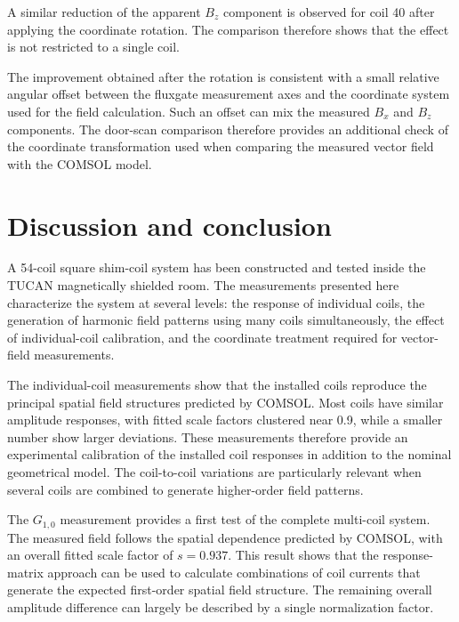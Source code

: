\documentclass[preprint,12pt]{elsarticle}
\begin{document}
A similar reduction of the apparent $B_z$ component is observed for
coil 40 after applying the coordinate rotation. The comparison
therefore shows that the effect is not restricted to a single coil.

The improvement obtained after the rotation is consistent with a small
relative angular offset between the fluxgate measurement axes and the
coordinate system used for the field calculation. Such an offset can
mix the measured $B_x$ and $B_z$ components. The door-scan comparison
therefore provides an additional check of the coordinate transformation
used when comparing the measured vector field with the COMSOL model.
\section{Discussion and conclusion}
\label{sec:discussion_conclusion}

A 54-coil square shim-coil system has been constructed and tested inside
the TUCAN magnetically shielded room. The measurements presented here
characterize the system at several levels: the response of individual
coils, the generation of harmonic field patterns using many coils
simultaneously, the effect of individual-coil calibration, and the
coordinate treatment required for vector-field measurements.

The individual-coil measurements show that the installed coils reproduce
the principal spatial field structures predicted by COMSOL. Most coils
have similar amplitude responses, with fitted scale factors clustered
near 0.9, while a smaller number show larger deviations. These
measurements therefore provide an experimental calibration of the
installed coil responses in addition to the nominal geometrical model.
The coil-to-coil variations are particularly relevant when several coils
are combined to generate higher-order field patterns.

The $G_{1,0}$ measurement provides a first test of the complete
multi-coil system. The measured field follows the spatial dependence
predicted by COMSOL, with an overall fitted scale factor of
$s=0.937$. This result shows that the response-matrix approach can be
used to calculate combinations of coil currents that generate the
expected first-order spatial field structure. The remaining overall
amplitude difference can largely be described by a single
normalization factor.
\end{document}
